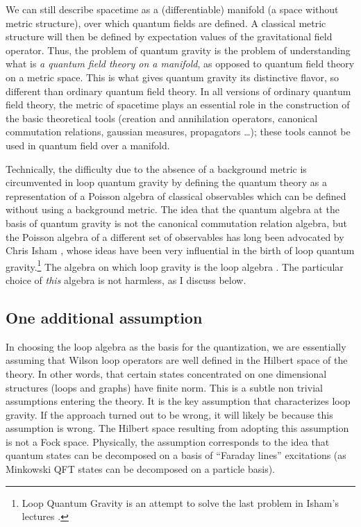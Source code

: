 \documentclass[12pt]{article}
\begin{document}
We can still describe spacetime as a (differentiable) manifold (a 
space without metric structure), over which quantum fields are 
defined.  A classical metric structure will then be defined by 
expectation values of the gravitational field operator.  Thus, 
the problem of quantum gravity is the problem of understanding 
what is {\em a quantum field theory on a manifold}, 
as opposed to quantum field theory on a metric space.  This is 
what gives quantum gravity its distinctive flavor, so different 
than ordinary quantum field theory.  In all versions of ordinary 
quantum field theory, the metric of spacetime plays an essential 
role in the construction of the basic theoretical tools (creation 
and annihilation operators, canonical commutation relations, 
gaussian measures, propagators \ldots ); these tools cannot be 
used in quantum field over a manifold.

Technically, the difficulty due to the absence of a background 
metric is circumvented in loop quantum gravity by defining the 
quantum theory as a representation of a Poisson algebra of 
classical observables which can be defined without using a 
background metric.  The idea that the quantum algebra at the basis 
of quantum gravity is not the canonical commutation relation 
algebra, but the Poisson algebra of a different set of observables 
has long been advocated by Chris Isham \cite{IshamLesHouches}, 
whose ideas have been very influential in the birth of loop 
quantum gravity.\footnote{Loop Quantum Gravity is an attempt to 
solve the last problem in Isham's lectures 
\cite{IshamLesHouches}.} The algebra on which loop gravity is the 
loop algebra \cite{RovelliSmolin90}.  The particular choice of 
{\em this\/} algebra is not harmless, as I discuss below.

\subsection{One additional assumption} \label{Additional}

In choosing the loop algebra as the basis for the quantization, 
we are essentially assuming that Wilson loop operators are well 
defined in the Hilbert space of the theory.  In other words, that 
certain states concentrated on one dimensional structures (loops 
and graphs) have finite norm.  This is a subtle non trivial 
assumptions entering the theory.  It is the key assumption that 
characterizes loop gravity.  If the approach turned out to be 
wrong, it will likely be because this assumption is wrong.  The 
Hilbert space resulting from adopting this assumption is not a 
Fock space.  Physically, the assumption corresponds to the idea 
that quantum states can be decomposed on a basis of ``Faraday 
lines'' excitations (as Minkowski QFT states can be decomposed on 
a particle basis).
\end{document}
